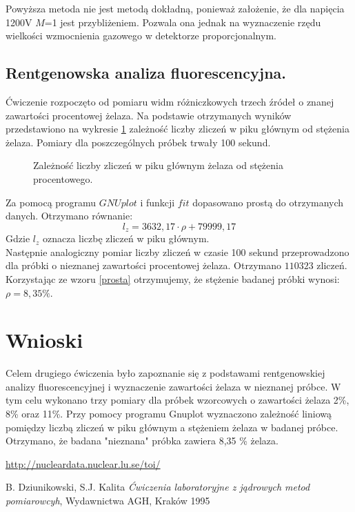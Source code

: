 \documentclass{article}
\begin{document}
Powyższa metoda nie jest metodą dokładną, ponieważ założenie, że dla napięcia 1200V $M$=1 jest przybliżeniem. Pozwala ona jednak na wyznaczenie rzędu wielkości wzmocnienia gazowego w detektorze proporcjonalnym.

\subsection{Rentgenowska analiza fluorescencyjna.}

Ćwiczenie rozpoczęto od pomiaru widm różniczkowych trzech źródeł o znanej zawartości procentowej żelaza. Na podstawie otrzymanych wyników przedstawiono na wykresie \ref{zaleznosc} zależność liczby zliczeń w piku głównym od stężenia żelaza. Pomiary dla poszczególnych próbek trwały 100 sekund.

\begin{figure}[h!]
	\centering	
	\fontsize{12}{16}\selectfont %
	\resizebox{0.9\textwidth}{!}{}		
	\caption{Zależność liczby zliczeń w piku głównym żelaza od stężenia procentowego.}
	\label{zaleznosc}
\end{figure}

Za pomocą programu $GNUplot$ i funkcji $fit$ dopasowano prostą do otrzymanych danych. Otrzymano równanie:
\begin{equation}
	l_z = 3632,17\cdot \rho + 79999,17
	\label{prosta}
\end{equation}
Gdzie $l_z$ oznacza liczbę zliczeń w piku głównym. \\

Następnie analogiczny pomiar liczby zliczeń w czasie 100 sekund przeprowadzono dla próbki o nieznanej zawartości procentowej żelaza. Otrzymano $110323$ zliczeń. Korzystając ze wzoru \ref{prosta} otrzymujemy, że stężenie badanej próbki wynosi: $\rho = 8,35 \%$. 
\section{Wnioski}

Celem drugiego ćwiczenia było zapoznanie się z podstawami rentgenowskiej analizy fluorescencyjnej i wyznaczenie zawartości żelaza w nieznanej próbce. W tym celu wykonano trzy pomiary dla próbek wzorcowych o zawartości żelaza 2\%, 8\% oraz 11\%. Przy pomocy programu Gnuplot wyznaczono zależność liniową pomiędzy liczbą zliczeń w piku głównym a stężeniem żelaza w badanej próbce. Otrzymano, że badana "nieznana" próbka zawiera 8,35 \% żelaza.
\newpage
\begin{thebibliography}{9}
	
	
	\url{http://nucleardata.nuclear.lu.se/toi/}

	
	B. Dziunikowski, S.J. Kalita
	\emph{Ćwiczenia laboratoryjne z jądrowych metod pomiarowcyh}, Wydawnictwa AGH, Kraków 1995
	
\end{thebibliography}
\vspace{2cm}
\end{document}
